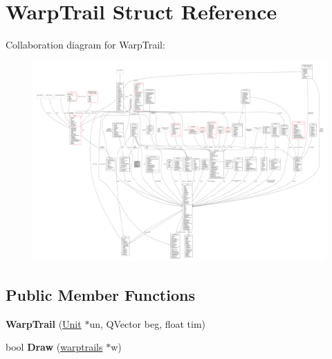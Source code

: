\hypertarget{structWarpTrail}{}\section{Warp\+Trail Struct Reference}
\label{structWarpTrail}


Collaboration diagram for Warp\+Trail\+:
\nopagebreak
\begin{figure}[H]
\begin{center}
\leavevmode
\includegraphics[width=350pt]{d8/d82/structWarpTrail__coll__graph}
\end{center}
\end{figure}
\subsection*{Public Member Functions}
\begin{DoxyCompactItemize}
\item 
{\bfseries Warp\+Trail} (\hyperlink{classUnit}{Unit} $\ast$un, Q\+Vector beg, float tim)\hypertarget{structWarpTrail_a9dec8c230d911c8cea59daefbbd32a71}{}\label{structWarpTrail_a9dec8c230d911c8cea59daefbbd32a71}

\item 
bool {\bfseries Draw} (\hyperlink{structwarptrails}{warptrails} $\ast$w)\hypertarget{structWarpTrail_a9f92b7a5d9200dbc9c1f19476d8f990d}{}\label{structWarpTrail_a9f92b7a5d9200dbc9c1f19476d8f990d}

\end{DoxyCompactItemize}
